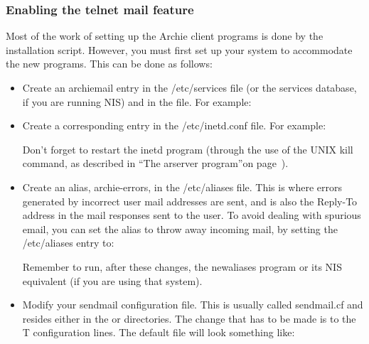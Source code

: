 \subsubsection{Enabling the telnet mail feature}
\label{sec:telnetmail}

Most of the work of setting up the Archie client programs is done by the
installation script. However, you must first set up your system to accommodate
the new programs. This can be done as follows:

\begin{itemize}
\item
Create an archiemail entry in the /etc/services file (or the services
database, if you are running NIS) and in the  file. For
example:


\item
Create a corresponding entry in the /etc/inetd.conf file. For example:


Don't forget to restart the inetd program (through the use of the UNIX kill
command, as described in ``The arserver program''on page~\pageref{sec:arserver}).


\item Create an alias, archie-errors, in the /etc/aliases file. This is where
errors generated by incorrect user mail addresses are sent, and is also the
Reply-To address in the mail responses sent to the user. To avoid dealing with
spurious email, you can set the alias to throw away incoming mail, by setting
the /etc/aliases entry to:


Remember to run, after these changes, the newaliases program or its NIS
equivalent (if you are using that system).

\item
Modify your sendmail configuration file. This is usually called sendmail.cf
and resides either in the  or  directories. The
change that has to be made is to the T configuration lines. The default file
will look something like:








\end{itemize}
